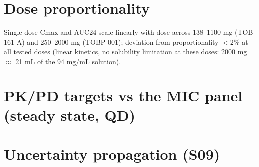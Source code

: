\section{Dose proportionality}
Single-dose Cmax and AUC24 scale linearly with dose across 138--1100 mg (TOB-161-A) and 250--2000 mg (TOBP-001); deviation from proportionality $<$2\% at all tested doses (linear kinetics, no solubility limitation at these doses: 2000 mg $\approx$ 21 mL of the 94 mg/mL solution).

\section{PK/PD targets vs the MIC panel (steady state, QD)}

\begin{table}[htbp]
\centering
\caption{Steady-state target attainment vs MIC (true 7-day once-daily dosing).}
\label{tab:app-mic-panel}
\end{table}

\section{Uncertainty propagation (S09)}

